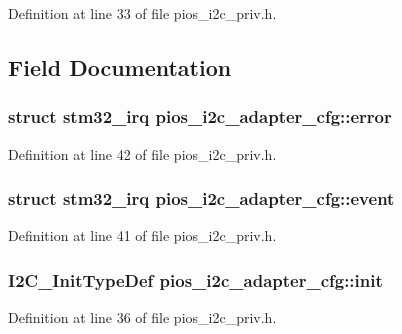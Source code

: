 Definition at line 33 of file pios\-\_\-i2c\-\_\-priv.\-h.



\subsection{Field Documentation}
\hypertarget{structpios__i2c__adapter__cfg_a5e418625b07806a90c8f5a55cc1165eb}{
\subsubsection[{error}]{\setlength{\rightskip}{0pt plus 5cm}struct {\bf stm32\-\_\-irq} pios\-\_\-i2c\-\_\-adapter\-\_\-cfg\-::error}}\label{structpios__i2c__adapter__cfg_a5e418625b07806a90c8f5a55cc1165eb}


Definition at line 42 of file pios\-\_\-i2c\-\_\-priv.\-h.

\hypertarget{structpios__i2c__adapter__cfg_acdad71da492ab5d4582a5b03cd7d1ab2}{
\subsubsection[{event}]{\setlength{\rightskip}{0pt plus 5cm}struct {\bf stm32\-\_\-irq} pios\-\_\-i2c\-\_\-adapter\-\_\-cfg\-::event}}\label{structpios__i2c__adapter__cfg_acdad71da492ab5d4582a5b03cd7d1ab2}


Definition at line 41 of file pios\-\_\-i2c\-\_\-priv.\-h.

\hypertarget{structpios__i2c__adapter__cfg_a7c0f3d2e295cc0583245ad41d61e33fe}{
\subsubsection[{init}]{\setlength{\rightskip}{0pt plus 5cm}I2\-C\-\_\-\-Init\-Type\-Def pios\-\_\-i2c\-\_\-adapter\-\_\-cfg\-::init}}\label{structpios__i2c__adapter__cfg_a7c0f3d2e295cc0583245ad41d61e33fe}


Definition at line 36 of file pios\-\_\-i2c\-\_\-priv.\-h.

